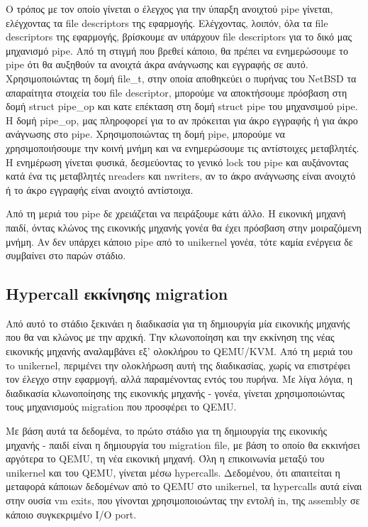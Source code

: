 Ο τρόπος με τον οποίο γίνεται ο έλεγχος για την ύπαρξη ανοιχτού pipe γίνεται,
ελέγχοντας τα file descriptors της εφαρμογής. Ελέγχοντας, λοιπόν, όλα τα file
descriptors της εφαρμογής, βρίσκουμε αν υπάρχουν file descriptors για το δικό
μας μηχανισμό pipe. Από τη στιγμή που βρεθεί κάποιο, θα πρέπει να ενημερώσουμε
το pipe ότι θα αυξηθούν τα ανοιχτά άκρα ανάγνωσης και εγγραφής σε αυτό.
Χρησιμοποιώντας τη δομή file\_t, στην οποία αποθηκεύει ο πυρήνας του NetBSD τα
απαραίτητα στοιχεία του file descriptor, μπορούμε να αποκτήσουμε πρόσβαση στη
δομή struct pipe\_op και κατε επέκταση στη δομή struct pipe του μηχανσιμού pipe.
Η δομή pipe\_op, μας πληροφορεί για το αν πρόκειται για άκρο εγγραφής ή για άκρο
ανάγνωσης στο pipe. Χρησιμοποιώντας τη δομή pipe, μπορούμε να χρησιμοποιήσουμε
την κοινή μνήμη και να ενημερώσουμε τις αντίστοιχες μεταβλητές. Η ενημέρωση
γίνεται φυσικά, δεσμεύοντας το γενικό lock του pipe και αυξάνοντας κατά ένα τις
μεταβλητές nreaders και nwriters, αν το άκρο ανάγνωσης είναι ανοιχτό ή το άκρο
εγγραφής είναι ανοιχτό αντίστοιχα. 

Από τη μεριά του pipe δε χρειάζεται να πειράξουμε κάτι άλλο. Η εικονική μηχανή
παιδί, όντας κλώνος της εικονικής μηχανής γονέα θα έχει πρόσβαση στην
μοιραζόμενη μνήμη. Αν δεν υπάρχει κάποιο pipe από το unikernel γονέα, τότε καμία
ενέργεια δε συμβαίνει στο παρών στάδιο.

\subsection{Hypercall εκκίνησης migration}

Από αυτό το στάδιο ξεκινάει η διαδικασία για τη δημιουργία μία εικονικής μηχανής
που θα ναι κλώνος με την αρχική. Την κλωνοποίηση και την εκκίνηση της νέας
εικονικής μηχανής αναλαμβάνει εξ' ολοκλήρου το QEMU/KVM. Από τη μεριά του τo 
unikernel, περιμένει την ολοκλήρωση αυτή της διαδικασίας, χωρίς να επιστρέφει
τον έλεγχο στην εφαρμογή, αλλά παραμένοντας εντός του πυρήνα. Με λίγα λόγια, η
διαδικασία κλωνοποίησης της εικονικής μηχανής - γονέα, γίνεται χρησιμοποιώντας
τους μηχανισμούς migration που προσφέρει το QEMU. 

Με βάση αυτά τα δεδομένα, το πρώτο στάδιο για τη δημιουργία της εικονικής
μηχανής - παιδί είναι η δημιουργία του migration file, με βάση το οποίο θα
εκκινήσει αργότερα το QEMU, τη νέα εικονική μηχανή. Όλη η επικοινωνία μεταξύ του
unikernel και του QEMU, γίνεται μέσω hypercalls. Δεδομένου, ότι απαιτείται η
μεταφορά κάποιων δεδομένων από το QEMU στο unikernel, τα hypercalls αυτά είναι
στην ουσία vm exits, που γίνονται χρησιμοποιοώντας την εντολή in, της assembly
σε κάποιο συγκεκριμένο I/O port. 

